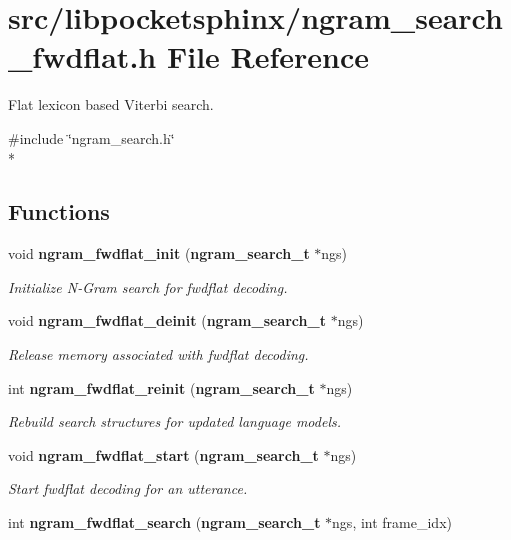 \section{src/libpocketsphinx/ngram\-\_\-search\-\_\-fwdflat.h File Reference}
\label{ngram__search__fwdflat_8h}


Flat lexicon based Viterbi search.  


{\ttfamily \#include \char`\"{}ngram\-\_\-search.\-h\char`\"{}}\\*
\subsection*{Functions}
\begin{DoxyCompactItemize}
\item 
void {\bf ngram\-\_\-fwdflat\-\_\-init} ({\bf ngram\-\_\-search\-\_\-t} $\ast$ngs)\label{ngram__search__fwdflat_8h_ad4b8ebd904c77f8a28f59cd5ca2c8307}

\begin{DoxyCompactList}\small\item\em Initialize N-\/\-Gram search for fwdflat decoding. \end{DoxyCompactList}\item 
void {\bf ngram\-\_\-fwdflat\-\_\-deinit} ({\bf ngram\-\_\-search\-\_\-t} $\ast$ngs)\label{ngram__search__fwdflat_8h_a8faf467f90162a7273b23304fc6e8586}

\begin{DoxyCompactList}\small\item\em Release memory associated with fwdflat decoding. \end{DoxyCompactList}\item 
int {\bf ngram\-\_\-fwdflat\-\_\-reinit} ({\bf ngram\-\_\-search\-\_\-t} $\ast$ngs)\label{ngram__search__fwdflat_8h_aa4879c06ddbc455a6f355084a9c574b4}

\begin{DoxyCompactList}\small\item\em Rebuild search structures for updated language models. \end{DoxyCompactList}\item 
void {\bf ngram\-\_\-fwdflat\-\_\-start} ({\bf ngram\-\_\-search\-\_\-t} $\ast$ngs)\label{ngram__search__fwdflat_8h_a763c2c7aaa5d7f9c5107af73552a2149}

\begin{DoxyCompactList}\small\item\em Start fwdflat decoding for an utterance. \end{DoxyCompactList}\item 
int {\bf ngram\-\_\-fwdflat\-\_\-search} ({\bf ngram\-\_\-search\-\_\-t} $\ast$ngs, int frame\-\_\-idx)\label{ngram__search__fwdflat_8h_ae77ef21ae92dbcc4b14f40469fbd4307}


\end{DoxyCompactItemize}
